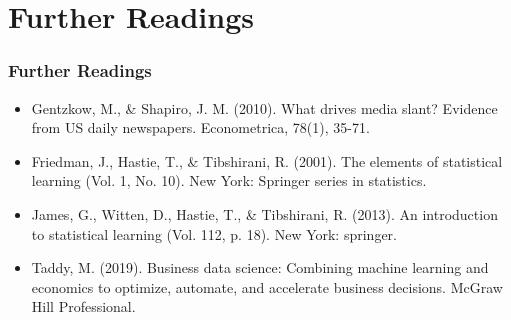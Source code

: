 \documentclass[
  shownotes,
  xcolor={svgnames},
  hyperref={colorlinks,citecolor=DarkBlue,linkcolor=DarkRed,urlcolor=DarkBlue}
  , aspectratio=169]{beamer}
\begin{document}
\section{Further Readings}
\begin{frame}
\frametitle{Further Readings}

\begin{itemize}

  \item Gentzkow, M., \& Shapiro, J. M. (2010). What drives media slant? Evidence from US daily newspapers. Econometrica, 78(1), 35-71.
  \medskip
  \item Friedman, J., Hastie, T., \& Tibshirani, R. (2001). The elements of statistical learning (Vol. 1, No. 10). New York: Springer series in statistics.
  \medskip
  \item James, G., Witten, D., Hastie, T., \& Tibshirani, R. (2013). An introduction to statistical learning (Vol. 112, p. 18). New York: springer.
  \medskip
  \item Taddy, M. (2019). Business data science: Combining machine learning and economics to optimize, automate, and accelerate business decisions. McGraw Hill Professional.

  
\end{itemize}

\end{frame}
\end{document}
